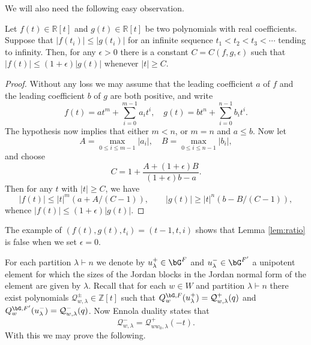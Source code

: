 \documentclass[eqthmnum,nocolour,skinny]{jt-calcs}
\newcommand{\R}{\mathbb {R}}
\begin{document}
We will also need the following easy observation.

\begin{lem}\label{lem:ratio}
Let $f(t) \in \R[t]$ and $g(t) \in \R[t]$ be two polynomials with real coefficients. Suppose that $|f(t_i)| \leq |g(t_i)|$ for an infinite sequence 
$t_1 < t_2 < t_3 < \cdots$ tending to infinity. Then, for any $\epsilon > 0$  there is a constant $C=C(f,g,\epsilon)$ such that $|f(t)| \leq (1+\epsilon)|g(t)|$ whenever $|t| \geq C$.
\end{lem}

\begin{proof}
Without any loss we may assume that the leading coefficient $a$ of $f$ and the leading coefficient $b$ of $g$ are both positive, and write
\begin{equation*}
f(t) = at^m + \sum^{m-1}_{i=0}a_it^i, \quad g(t) = bt^n + \sum^{n-1}_{i=0}b_it^i.
\end{equation*}
The hypothesis now implies that either $m < n$, or $m=n$ and $a \leq b$. Now let
\begin{equation*}
A = \max_{0 \leq i \leq m-1}|a_i|, \quad B = \max_{0 \leq i \leq n-1}|b_i|,
\end{equation*}
and choose
\begin{equation*}
C= 1+\frac{A+(1+\epsilon)B}{(1+\epsilon)b-a}.
\end{equation*}
Then for any $t$ with $|t| \geq C$, we have
\begin{equation*}
|f(t)| \leq |t|^m(a+A/(C-1)), \qquad |g(t)| \geq |t|^n(b-B/(C-1)),
\end{equation*}
whence $|f(t)| \leq (1+\epsilon)|g(t)|$.
\end{proof}

\begin{rem}
The example of $(f(t),g(t),t_i) = (t-1,t,i)$ shows that Lemma \ref{lem:ratio} is false when we set $\epsilon=0$.
\end{rem}

\begin{pa}
For each partition $\lambda \vdash n$ we denote by $u_{\lambda}^+ \in \bG^F$ and $u_{\lambda}^- \in \bG^{F'}$ a unipotent element for which the sizes of the Jordan blocks in the Jordan normal form of the element are given by $\lambda$. Recall that for each $w \in W$ and partition $\lambda \vdash n$ there exist polynomials $\mathcal{Q}_{w,\lambda}^{\pm} \in \mathbb{Z}[t]$ such that $Q_w^{\bG,F}(u_{\lambda}^+) = \mathcal{Q}_{w,\lambda}^+(q)$ and $Q_w^{\bG,F'}(u_{\lambda}^-) = \mathcal{Q}_{w,\lambda}^-(q)$. Now Ennola duality states that
\begin{equation*}
\mathcal{Q}_{w,\lambda}^- = \mathcal{Q}_{ww_0,\lambda}^+(-t).
\end{equation*}
With this we may prove the following.
\end{pa}
\end{document}
